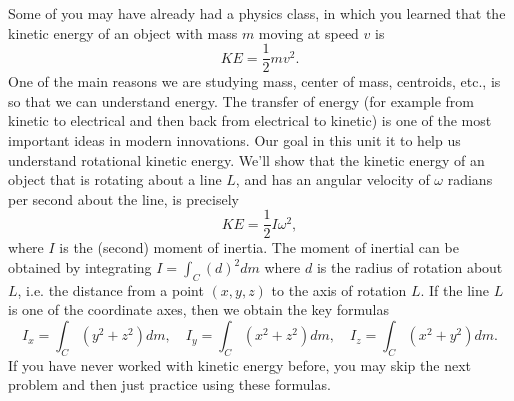 Some of you may have already had a physics class, in which you learned that the kinetic energy of an object with mass $m$ moving at speed $v$ is $$KE = \frac{1}{2}mv^2.$$
One of the main reasons we are studying mass, center of mass, centroids, etc., is so that we can understand energy. The transfer of energy (for example from kinetic to electrical and then back from electrical to kinetic) is one of the most important ideas in modern innovations. Our goal in this unit it to help us understand rotational kinetic energy. We'll show that the kinetic energy of an object that is rotating about a line $L$, and has an angular velocity of $\omega$ radians per second about the line, is precisely $$KE = \frac{1}{2}I \omega^2,$$
where $I$ is the (second) moment of inertia. The moment of inertial can be obtained by integrating $I=\int_C (d)^2 dm$ where $d$ is the radius of rotation about $L$, i.e. the distance from a point $(x,y,z)$ to the axis of rotation $L$. If the line $L$ is one of the coordinate axes, then we obtain the key formulas 
$$
I_x = \int_C (y^2+z^2)dm,\quad
I_y = \int_C (x^2+z^2)dm,\quad
I_z = \int_C (x^2+y^2)dm
.$$
If you have never worked with kinetic energy before, you may skip the next problem and then just practice using these formulas.

